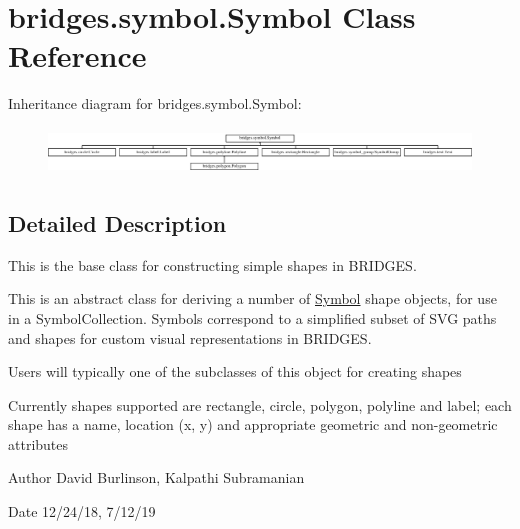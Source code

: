 \hypertarget{classbridges_1_1symbol_1_1_symbol}{}\section{bridges.\+symbol.\+Symbol Class Reference}
\label{classbridges_1_1symbol_1_1_symbol}
Inheritance diagram for bridges.\+symbol.\+Symbol\+:\begin{figure}[H]
\begin{center}
\leavevmode
\includegraphics[height=1.244444cm]{classbridges_1_1symbol_1_1_symbol}
\end{center}
\end{figure}


\subsection{Detailed Description}
This is the base class for constructing simple shapes in B\+R\+I\+D\+G\+ES. 

This is an abstract class for deriving a number of \hyperlink{classbridges_1_1symbol_1_1_symbol}{Symbol} shape objects, for use in a Symbol\+Collection. Symbols correspond to a simplified subset of S\+VG paths and shapes for custom visual representations in B\+R\+I\+D\+G\+ES.

Users will typically one of the subclasses of this object for creating shapes

Currently shapes supported are rectangle, circle, polygon, polyline and label; each shape has a name, location (x, y) and appropriate geometric and non-\/geometric attributes

\begin{DoxyAuthor}{Author}
David Burlinson, Kalpathi Subramanian 
\end{DoxyAuthor}
\begin{DoxyDate}{Date}
12/24/18, 7/12/19 
\end{DoxyDate}
